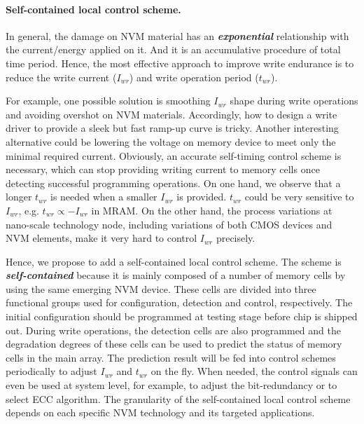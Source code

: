 \paragraph{Self-contained local control scheme.} In general, the damage on NVM material has an \textbf{\emph{exponential}} relationship with the current/energy applied on it. And it is an accumulative procedure of total time period. Hence, the most effective approach to improve write endurance is to reduce the write current ($I_{wr}$) and write operation period ($t_{wr}$).

For example, one possible solution is smoothing $I_{wr}$ shape during write operations and avoiding overshot on NVM materials. Accordingly, how to design a write driver to provide a sleek but fast ramp-up curve is tricky. Another interesting alternative could be lowering the voltage on memory device to meet only the minimal required current. Obviously, an accurate self-timing control scheme is necessary, which can stop providing writing current to memory cells once detecting successful programming operations. On one hand, we observe that a longer $t_{wr}$ is needed when a smaller $I_{wr}$ is provided. $t_{wr}$ could be very sensitive to $I_{wr}$, e.g. $t_{wr}\propto{-I_{wr}}$ in MRAM. On the other hand, the process variations at nano-scale technology node, including variations of both CMOS devices and NVM elements, make it very hard to control $I_{wr}$ precisely.

Hence, we propose to add a self-contained local control scheme. The scheme is \emph{\textbf{self-contained}} because it is mainly composed of a number of memory cells by using the same emerging NVM device. These cells are divided into three functional groups used for configuration, detection and control, respectively. The initial configuration should be programmed at testing stage before chip is shipped out. During write operations, the detection cells are also programmed and the degradation degrees of these cells can be used to predict the status of memory cells in the main array. The prediction result will be fed into control schemes periodically to adjust $I_{wr}$ and $t_{wr}$ on the fly. When needed, the control signals can even be used at system level, for example, to adjust the bit-redundancy or to select ECC algorithm. The granularity of the self-contained local control scheme depends on each specific NVM technology and its targeted applications.

